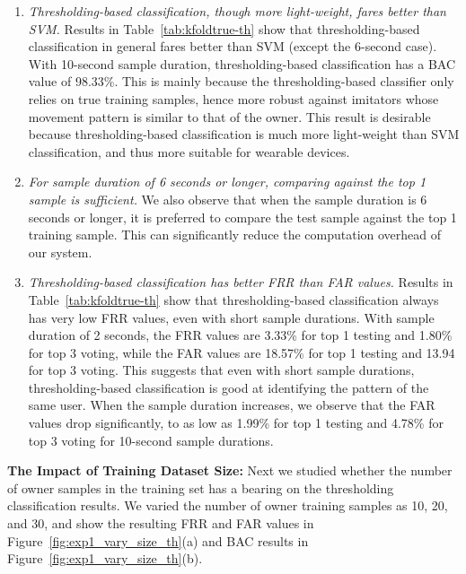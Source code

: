 \begin{enumerate}
\item \emph{Thresholding-based classification, though more light-weight, fares 
better than SVM.} Results in Table~\ref{tab:kfoldtrue-th} show that 
thresholding-based classification in general fares better than SVM (except the 
6-second case). With 10-second sample duration, thresholding-based 
classification has a BAC value of 98.33\%. This is mainly because the 
thresholding-based classifier only relies on true training samples, hence more 
robust against imitators whose movement pattern is similar to that of the 
owner. This result is desirable because thresholding-based classification is 
much more light-weight than SVM classification, and thus more suitable for 
wearable devices.

\item \emph{For sample duration of 6 seconds or longer, comparing against the 
top 1 sample is sufficient.} We also observe that when the sample duration is 
6 seconds or longer, it is preferred to compare the test sample against the 
top 1 training sample. This can significantly reduce the computation overhead 
of our system.

\item \emph{Thresholding-based classification has better FRR than FAR values.} 
Results in Table~\ref{tab:kfoldtrue-th} show that thresholding-based 
classification always has very low FRR values, even with short sample 
durations. With sample duration of 2 seconds, the FRR values are 3.33\% for 
top 1 testing and 1.80\% for top 3 voting, while the FAR values are 18.57\% 
for top 1 testing and 13.94 for top 3 voting. This suggests that even with 
short sample durations, thresholding-based classification is good at 
identifying the pattern of the same user. When the sample duration increases, 
we observe that the FAR values drop significantly, to as low as 1.99\% for top 
1 testing and 4.78\% for top 3 voting for 10-second sample durations.
\end{enumerate}

\vspace{4pt}\textbf{The Impact of Training Dataset Size:} Next we studied 
whether the number of owner samples in the training set has a bearing on the 
thresholding classification results. We varied the number of owner training 
samples as 10, 20, and 30, and show the resulting FRR and FAR values in 
Figure~\ref{fig:exp1_vary_size_th}(a) and BAC results in 
Figure~\ref{fig:exp1_vary_size_th}(b). %

